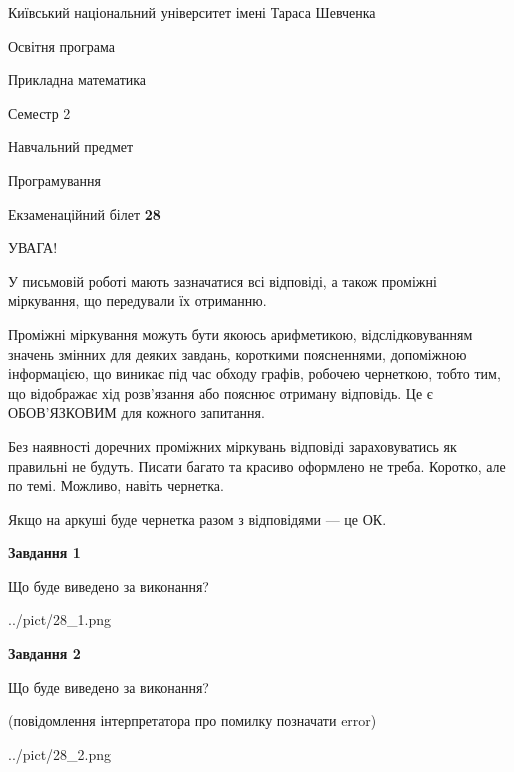 \documentclass[12pt, ukrainian]{article}
\begin{document}
{{\begin {small}\par
{ \center  Київський національний університет імені Тараса Шевченка \par}
{\parbox {5 cm}{Освітня програма \hfill}{\parbox {7 cm}{Прикладна математика\hfill}}\parbox {6 cm}{\hfill Семестр 2}}\par
{\parbox {5 cm} {Навчальний предмет \hfill}\parbox {7 cm}{Програмування \hfill}\parbox {6cm}{\hfill}\par}\vspace{-7pt} \end{small}}{\center Екзаменаційний білет \No \textbf
{ 28 }\par}}
{
\begin {large}
УВАГА!

У письмовій роботі мають зазначатися всі відповіді, а також проміжні міркування, що передували їх отриманню.

Проміжні міркування можуть бути якоюсь арифметикою, відслідковуванням зна\-чень змінних для деяких завдань,
короткими поясненнями, допоміжною інформацією, що виникає під час обходу графів, робочею чернеткою,
тобто тим, що відображає хід розв’язання або пояснює отриману відповідь.
Це є ОБОВ’ЯЗКОВИМ для кожного запитання.

Без наявності доречних проміжних міркувань відповіді зараховуватись як правиль\-ні не будуть.
Писати багато та красиво оформлено не треба. Коротко, але по темі. Можли\-во, навіть чернетка.

Якщо на аркуші буде чернетка разом з відповідями --- це ОК.

\newpage

{\begin {center}\textbf{Завдання 1}\end {center}}\par
Що буде виведено за виконання?\par
\begin{center}
	{../pict/28_1.png}
\end{center}
\newpage

{\begin {center}\textbf{Завдання 2}\end {center}}\par
Що буде виведено за виконання?\par
 (повідомлення інтерпретатора про помилку позначати error)\par
\begin{center}
	{../pict/28_2.png}
\end{center}
\newpage


\end{large}}
\end{document}
